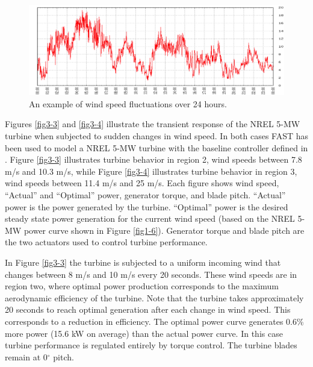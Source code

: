\begin{figure}[htbp]
	\centering
		\includegraphics[width=\linewidth]{Figures/ch3Figures/fig3-2.png}
		
	\caption{An example of wind speed fluctuations over 24 hours.\cite{NWTC2013}}
	\label{fig3-2}
\end{figure}

Figures  \ref{fig3-3} and  \ref{fig3-4} illustrate the transient response of the NREL 5-MW turbine when subjected to sudden changes in wind speed. In both cases FAST has been used to model a NREL 5-MW turbine with the baseline controller defined in \cite{jonkman2009}. Figure \ref{fig3-3} illustrates turbine behavior in region 2, wind speeds between 7.8 m/s and 10.3 m/s, while Figure \ref{fig3-4} illustrates turbine behavior in region 3, wind speeds between 11.4 m/s and 25 m/s.  Each figure shows wind speed, “Actual” and “Optimal” power, generator torque, and blade pitch. “Actual” power is the power generated by the turbine. “Optimal” power is the desired steady state power generation for the current wind speed (based on the NREL 5-MW power curve shown in Figure \ref{fig1-6}). Generator torque and blade pitch are the two actuators used to control turbine performance. 

In Figure \ref{fig3-3} the turbine is subjected to a uniform incoming wind that changes between 8 m/s and 10 m/s every 20 seconds. These wind speeds are in region two, where optimal power production corresponds to the maximum aerodynamic efficiency of the turbine. Note that the turbine takes approximately 20 seconds to reach optimal generation after each change in wind speed. This corresponds to a reduction in efficiency.  The optimal power curve generates 0.6\% more power (15.6 kW on average) than the actual power curve. In this case turbine performance is regulated entirely by torque control. The turbine blades remain at 0$^{\circ}$ pitch. 

